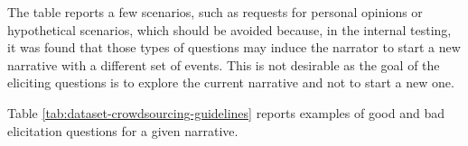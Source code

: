 The table reports a few scenarios, such as requests for personal opinions or hypothetical scenarios, which should be avoided because, in the internal testing, it was found that those types of questions may induce the narrator to start a new narrative with a different set of events. This is not desirable as the goal of the eliciting questions is to explore the current narrative and not to start a new one.

Table \ref{tab:dataset-crowdsourcing-guidelines} reports examples of good and bad elicitation questions for a given narrative. 
